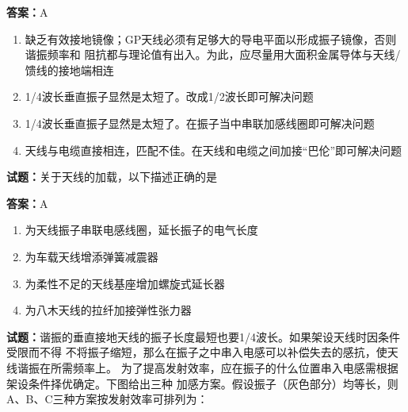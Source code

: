 \documentclass{ctexbook}
\begin{document}
\textbf{答案：}A 

\begin{enumerate}[leftmargin=3em]
  \item 缺乏有效接地镜像；GP天线必须有足够大的导电平面以形成振子镜像，否则谐振频率和
阻抗都与理论值有出入。为此，应尽量用大面积金属导体与天线/馈线的接地端相连 

  \item 1/4波长垂直振子显然是太短了。改成1/2波长即可解决问题 

  \item 1/4波长垂直振子显然是太短了。在振子当中串联加感线圈即可解决问题 

  \item 天线与电缆直接相连，匹配不佳。在天线和电缆之间加接“巴伦”即可解决问题 

\end{enumerate}





\vspace{1em}

\textbf{试题：}关于天线的加载，以下描述正确的是 

\textbf{答案：}A 

\begin{enumerate}[leftmargin=3em]
  \item 为天线振子串联电感线圈，延长振子的电气长度 

  \item 为车载天线增添弹簧减震器 

  \item 为柔性不足的天线基座增加螺旋式延长器 

  \item 为八木天线的拉纤加接弹性张力器 

\end{enumerate}





\vspace{1em}

\textbf{试题：}谐振的垂直接地天线的振子长度最短也要1/4波长。如果架设天线时因条件受限而不得
不将振子缩短，那么在振子之中串入电感可以补偿失去的感抗，使天线谐振在所需频率上。
为了提高发射效率，应在振子的什么位置串入电感需根据架设条件择优确定。下图给出三种
加感方案。假设振子（灰色部分）均等长，则A、B、C三种方案按发射效率可排列为： 
\end{document}
